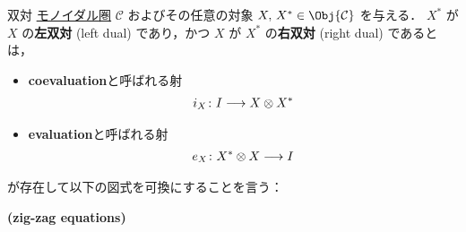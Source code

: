 \documentclass[TQFT_main]{subfiles}
\begin{document}
\begin{mydef}[label=redef:dual,breakable]{双対}
    \hyperref[def:monoidal-category]{モノイダル圏} $\mathcal{C}$ およびその任意の対象 $X,\, X^* \in \Obj{\mathcal{C}}$ を与える．
    $X^*$ が $X$ の\textbf{左双対} (left dual) であり，かつ $X$ が $X^*$ の\textbf{右双対} (right dual) であるとは，
    \begin{itemize}
        \item \textbf{coevaluation}と呼ばれる射
        \begin{align}
            i_X \colon I \longrightarrow X \otimes X^*
        \end{align}
        \item \textbf{evaluation}と呼ばれる射
        \begin{align}
            e_X \colon X^* \otimes X \longrightarrow I
        \end{align}
    \end{itemize}
    が存在して以下の図式を可換にすることを言う：
    \begin{description}
        \item[\textbf{(zig-zag equations)}]　
        
        \begin{center}
        \end{center}

        \begin{center}
        \end{center}
    \end{description}
\end{mydef}
\end{document}
